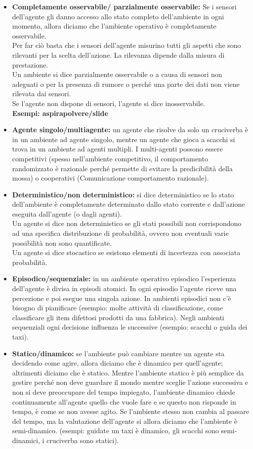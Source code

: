 \documentclass{article}
\begin{document}
\begin{itemize}
    \item \textbf{Completamente osservabile/ parzialmente osservabile: }Se i sensori dell'agente gli danno accesso allo stato completo dell'ambiente in ogni momento, allora diciamo che l'ambiente operativo è completamente osservabile.\\
    Per far ciò basta che i sensori dell'agente misurino tutti gli aspetti che sono rilevanti per la scelta dell'azione. La rilevanza dipende dalla misura di prestazione.\\
    Un ambiente si dice parzialmente osservabile o a causa di sensori non adeguati o per la presenza di rumore o perché una parte dei dati non viene rilevata dai sensori.\\
    Se l'agente non dispone di sensori, l'agente si dice inosservabile.\\
    \textbf{Esempi: aspirapolvere/slide}
    \item \textbf{Agente singolo/multiagente: }un agente che risolve da solo un cruciverba è in un ambiente ad agente singolo, mentre un agente che gioca a scacchi si trova in un ambiente ad agenti multipli. I multi-agenti possono essere competitivi (spesso nell'ambiente competitivo, il comportamento randomizzato è razionale perché permette di evitare la predicibilità della mossa) o cooperativi (Comunicazione comportamento razionale).
    \item \textbf{Deterministico/non deterministico: }si dice deterministico se lo stato dell'ambiente è completamente determinato dallo stato corrente e dall'azione eseguita dall'agente (o dagli agenti).\\
    Un agente si dice non deterministico se gli stati possibili non corrispondono ad una specifica distribuzione di probabilità, ovvero non eventuali varie possibilità non sono quantificate.\\
    Un agente si dice stocastico se esistono elementi di incertezza con associata probabilità.
    \item \textbf{Episodico/sequenziale: }in un ambiente operativo episodico l'esperienza dell'agente è divisa in episodi atomici. In ogni episodio l'agente riceve una percezione e poi esegue una singola azione. In ambienti episodici non c'è bisogno di pianificare (esempio: molte attività di classificazione, come classificare gli item difettosi prodotti da una fabbrica). Negli ambienti sequenziali ogni decisione influenza le successive (esempio: scacchi o guida dei taxi).
    \item \textbf{Statico/dinamico: }se l'ambiente può cambiare mentre un agente sta decidendo come agire, allora diciamo che è dinamico per quell'agente; altrimenti diciamo che è statico. Mentre l'ambiente statico è più semplice da gestire perché non deve guardare il mondo mentre sceglie l'azione successiva e non si deve preoccupare del tempo impiegato, l'ambiente dinamico chiede continuamente all'agente quello che vuole fare e se questo non risponde in tempo, è come se non avesse agito. Se l'ambiente stesso non cambia al passare del tempo, ma la valutazione dell'agente si allora diciamo che l'ambiente è semi-dinamico. (esempi: guidate un taxi è dinamico, gli scacchi sono semi-dinamici, i cruciverba sono statici).

\end{itemize}
\end{document}
